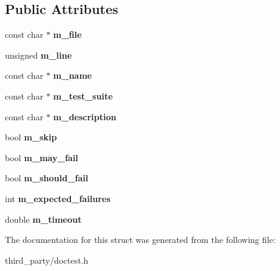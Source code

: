 \subsection*{Public Attributes}
\begin{DoxyCompactItemize}
\item 
\mbox{\label{structdoctest_1_1_test_case_data_a2fd47118d7424ba2e3c142b18d47167f}} 
const char $\ast$ {\bfseries m\+\_\+file}
\item 
\mbox{\label{structdoctest_1_1_test_case_data_aaabb9765e7aa39416c058a9cbccef57f}} 
unsigned {\bfseries m\+\_\+line}
\item 
\mbox{\label{structdoctest_1_1_test_case_data_a0cb34895130be773e624526d68e5b2cd}} 
const char $\ast$ {\bfseries m\+\_\+name}
\item 
\mbox{\label{structdoctest_1_1_test_case_data_ae264da66ff0e88a34c467d364dd18840}} 
const char $\ast$ {\bfseries m\+\_\+test\+\_\+suite}
\item 
\mbox{\label{structdoctest_1_1_test_case_data_abd855851b4b9edbaf46c3458abc1ba80}} 
const char $\ast$ {\bfseries m\+\_\+description}
\item 
\mbox{\label{structdoctest_1_1_test_case_data_a0c2353bd3fd8c2fa84d34ab4e973e038}} 
bool {\bfseries m\+\_\+skip}
\item 
\mbox{\label{structdoctest_1_1_test_case_data_a887b70bf52f74724f0d7fe99d43a8783}} 
bool {\bfseries m\+\_\+may\+\_\+fail}
\item 
\mbox{\label{structdoctest_1_1_test_case_data_a037f6dfb931aff9c9b17f31203a3987e}} 
bool {\bfseries m\+\_\+should\+\_\+fail}
\item 
\mbox{\label{structdoctest_1_1_test_case_data_a6c5995f53ad39769bf06600e562ea9eb}} 
int {\bfseries m\+\_\+expected\+\_\+failures}
\item 
\mbox{\label{structdoctest_1_1_test_case_data_a8cab4a7998b486bafa81498f93dd4d91}} 
double {\bfseries m\+\_\+timeout}
\end{DoxyCompactItemize}


The documentation for this struct was generated from the following file\+:\begin{DoxyCompactItemize}
\item 
third\+\_\+party/doctest.\+h\end{DoxyCompactItemize}
